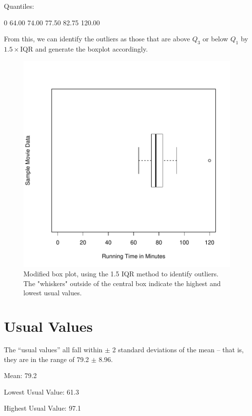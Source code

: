 \documentclass[twocolumn,english]{IEEEtran}
\theoremstyle{plain}
\theoremstyle{plain}
\begin{document}
Quantiles:
\begin{Schunk}
\begin{Soutput}
    0%
 64.00  74.00  77.50  82.75 120.00
\end{Soutput}
\end{Schunk}

From this, we can identify the outliers as those that are above $Q_3$ or below $Q_1$ by $1.5\times$IQR and generate the boxplot accordingly.

\begin{figure}[H]
\begin{centering}
\includegraphics{proj1-boxplot1}
\caption{Modified box plot, using the 1.5 IQR method to identify outliers. The "whiskers" outside of the central box indicate the highest and lowest usual values.}
\label{fig:one}
\end{centering}
\end{figure}

\section{Usual Values}
The ``usual values'' all fall within $\pm$ 2 standard deviations of the mean -- that is, they are in the range of 79.2 $\pm$ 8.96.


\begin{Schunk}
\begin{Soutput}
Mean:  79.2
\end{Soutput}
\begin{Soutput}
Lowest Usual Value:  61.3
\end{Soutput}
\begin{Soutput}
Highest Usual Value:  97.1
\end{Soutput}
\end{Schunk}
\end{document}
